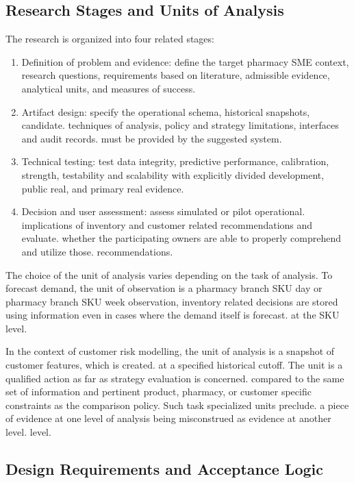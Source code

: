 \documentclass[a4paper,11pt,oneside]{book}
\theoremstyle{plain}
\theoremstyle{definition}
\theoremstyle{remark}
\begin{document}
\subsection{Research Stages and Units of Analysis}

The research is organized into four related stages:

\begin{enumerate}[label=P\arabic*.]
    \item Definition of problem and evidence: define the target pharmacy SME context, research questions, requirements based on literature, admissible evidence, analytical units, and measures of success.
    \item Artifact design: specify the operational schema, historical snapshots, candidate. techniques of analysis, policy and strategy limitations, interfaces and audit records. must be provided by the suggested system.
    \item Technical testing: test data integrity, predictive performance, calibration, strength, testability and scalability with explicitly divided development, public real, and primary real evidence.
    \item Decision and user assessment: assess simulated or pilot operational. implications of inventory and customer related recommendations and evaluate. whether the participating owners are able to properly comprehend and utilize those. recommendations.
\end{enumerate}

The choice of the unit of analysis varies depending on the task of analysis. To forecast demand, the unit of observation is a pharmacy branch SKU day or pharmacy branch SKU week observation, inventory related decisions are stored using information even in cases where the demand itself is forecast. at the SKU level.

In the context of customer risk modelling, the unit of analysis is a snapshot of customer features, which is created. at a specified historical cutoff. The unit is a qualified action as far as strategy evaluation is concerned. compared to the same set of information and pertinent product, pharmacy, or customer specific constraints as the comparison policy. Such task specialized units preclude. a piece of evidence at one level of analysis being misconstrued as evidence at another level. level.

\subsection{Design Requirements and Acceptance Logic}
\end{document}
